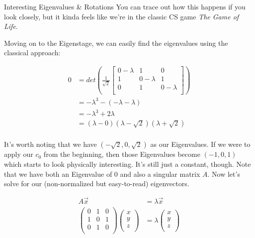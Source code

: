 \begin{answer}
\begin{answerpart}{Interesting Eigenvalues \& Rotations}
    You can trace out how this happens if you look closely, but it
    kinda feels like we're in the classic CS game \emph{The Game of
    Life}.

    Moving on to the Eigenstage, we can easily find the eigenvalues
    using the classical approach:

    \begin{equation}
      \begin{split}
        0 &=
        det \left(
        \frac{1}{\sqrt{2}}
        \begin{bmatrix}
          0-\lambda & 1 & 0\\
          1 & 0-\lambda & 1\\
          0 & 1 & 0-\lambda\\
        \end{bmatrix}
        \right)\\
        &= -\lambda^3 - (-\lambda - \lambda)\\
        &= -\lambda^3 + 2\lambda\\
        &= (\lambda - 0)(\lambda - \sqrt{2})(\lambda + \sqrt{2})\\
      \end{split}
    \end{equation}

    It's worth noting that we have $(-\sqrt{2}, 0, \sqrt{2})$ as our
    Eigenvalues.  If we were to apply our $c_0$ from the beginning,
    then those Eigenvalues become $(-1, 0, 1)$ which starts to look
    physically interesting.  It's still just a constant, though.  Note
    that we have both an Eigenvalue of $0$ and also a singular matrix
    $A$.  Now let's solve for our (non-normalized but easy-to-read)
    eigenvectors.

    \begin{equation}
      \begin{split}
        A \vec{x} &= \lambda\vec{x}\\
        \begin{pmatrix}
          0 & 1 & 0\\
          1 & 0 & 1\\
          0 & 1 & 0\\
        \end{pmatrix}
        \begin{pmatrix}
          x\\
          y\\
          z\\
        \end{pmatrix}
        &=
        \lambda
        \begin{pmatrix}
          x\\
          y\\
          z\\
        \end{pmatrix}\\
      \end{split}
    \end{equation}


\end{answerpart}
\end{answer}
